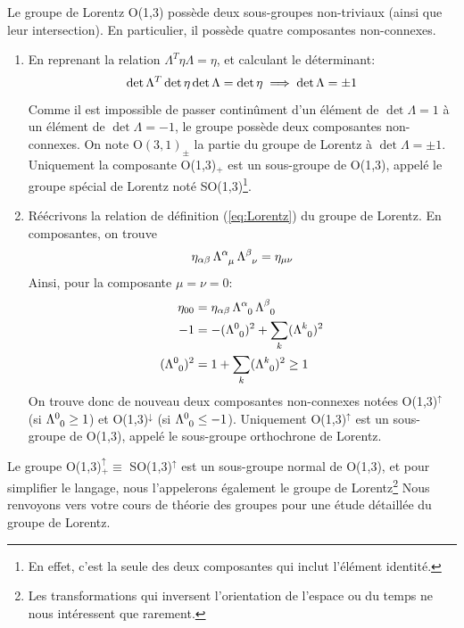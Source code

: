 {Le groupe de Lorentz O(1,3) possède deux sous-groupes non-triviaux (ainsi que leur intersection). En particulier, il possède quatre composantes non-connexes.

\begin{enumerate}
    \item En reprenant la relation $\Lambda ^{T} \eta \Lambda = \eta$, et calculant le déterminant:
    \begin{equation}
        \det \Lambda^{T} \det \eta \det\Lambda = \det \eta \\
        \implies \det\Lambda = \pm 1
    \end{equation}
    Comme il est impossible de passer continûment d'un élément de $\det \Lambda =1$ à un élément de $\det\Lambda = -1$, le groupe possède deux composantes non-connexes. On note O$(3,1)_\pm$ la partie du groupe de Lorentz à $\det\Lambda = \pm 1$.\\
    Uniquement la composante O(1,3)$_+$ est un sous-groupe de O(1,3), appelé le groupe spécial de Lorentz noté SO(1,3)\footnote{En effet, c'est la seule des deux composantes qui inclut l'élément identité.}. \\

    \item Réécrivons la relation de définition (\ref{eq:Lorentz}) du groupe de Lorentz. En composantes, on trouve
    \begin{equation}
        \eta_{\alpha \beta}\, \Lambda\indices{^\alpha_{\mu}} \,\Lambda\indices{^\beta_{\nu}} = \eta_{\mu \nu}
    \end{equation}
    Ainsi, pour la composante $\mu = \nu =0$:
    \begin{align}
        \eta_{0 0} &= \eta_{\alpha \beta} \,\Lambda\indices{^\alpha_{0}} \, \Lambda\indices{^\beta_{0}} \\
        -1 &= -(\Lambda\indices{^0_{0}})^2 + \sum_{k}(\Lambda\indices{^k_0})^2\\
        (\Lambda\indices{^0_0})^2 &= 1 + \sum_{k}(\Lambda\indices{^k_0})^2 \geq 1
    \end{align}
    On trouve donc de nouveau deux composantes non-connexes notées O(1,3)$^\uparrow$ (si $\Lambda\indices{^0_0} \geq 1$) et O(1,3)$^\downarrow$ (si $\Lambda\indices{^0_0} \leq - 1$). Uniquement O(1,3)$^\uparrow$ est un sous-groupe de O(1,3), appelé le sous-groupe orthochrone de Lorentz.
\end{enumerate}
Le groupe O(1,3)$^\uparrow_+ \equiv$ SO(1,3)$^\uparrow$ est un sous-groupe normal de O(1,3), et pour simplifier le langage, nous l'appelerons également le groupe de Lorentz\footnote{Les transformations qui inversent l'orientation de l'espace ou du temps ne nous intéressent que rarement.} Nous renvoyons vers votre cours de théorie des groupes pour une étude détaillée du groupe de Lorentz.
}
